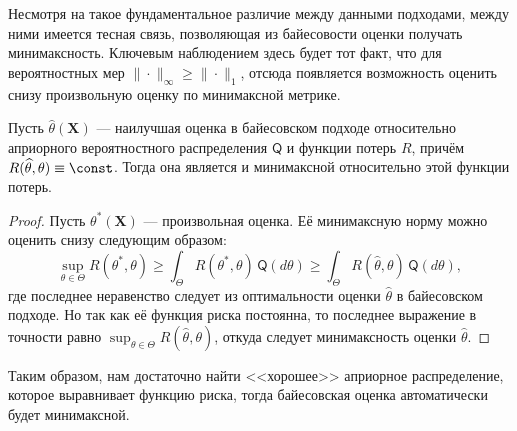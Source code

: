 Несмотря на такое фундаментальное различие между данными подходами, между ними имеется тесная связь, позволяющая из байесовости оценки получать минимаксность. Ключевым наблюдением здесь будет тот факт, что для вероятностных мер $\|\cdot\|_{\infty} \ge \|\cdot\|_{1}$, отсюда появляется возможность оценить снизу произвольную оценку по минимаксной метрике.

\begin{theorem}[label=bayes_implies_minimax]{}{}
	Пусть $\widehat{\theta}(\mathbf X)$ --- наилучшая оценка в байесовском подходе относительно априорного вероятностного распределения $\mathsf{Q}$ и функции потерь $R$, причём $R(\widehat{\theta}, \theta) \equiv \const$. Тогда она является и минимаксной относительно этой функции потерь.
\end{theorem}

\begin{proof}
	Пусть $\theta^*(\mathbf X)$ --- произвольная оценка. Её минимаксную норму можно оценить снизу следующим образом:
	\[
	\sup_{\theta\in\Theta} R(\theta^*, \theta) \ge \int_{\Theta} R(\theta^*, \theta) \,\mathsf{Q}(d\theta) \ge \int_{\Theta} R(\widehat \theta, \theta) \,\mathsf{Q}(d\theta),
	\]
	где последнее неравенство следует из оптимальности оценки $\widehat{\theta}$ в байесовском подходе. Но так как её функция риска постоянна, то последнее выражение в точности равно $\sup_{\theta\in\Theta} R(\widehat\theta, \theta)$, откуда следует минимаксность оценки $\widehat{\theta}$.
\end{proof}

Таким образом, нам достаточно найти <<хорошее>> априорное распределение, которое выравнивает функцию риска, тогда байесовская оценка автоматически будет минимаксной.

